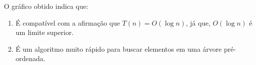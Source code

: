 O gráfico obtido indica que:

\begin{enumerate}
    \item É compatível com a afirmação que $T(n) = O(\log n)$, já que, $O(\log n)$ é um limite superior.
    \item É um algoritmo muito rápido para buscar elementos em uma árvore pré-ordenada.
\end{enumerate}
